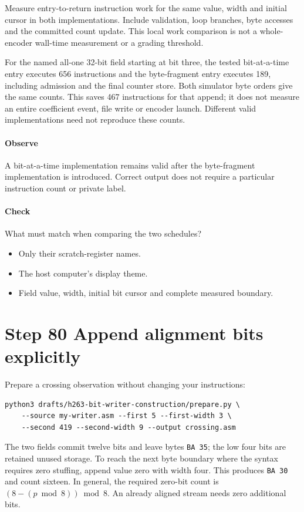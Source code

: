 Measure entry-to-return instruction work for the same value, width and initial
cursor in both implementations. Include validation, loop branches, byte accesses
and the committed count update. This local work comparison is not a whole-encoder
wall-time measurement or a grading threshold.

For the named all-one 32-bit field starting at bit three, the tested bit-at-a-time
entry executes 656 instructions and the byte-fragment entry executes 189, including
admission and the final counter store. Both simulator byte orders give the same
counts. This saves 467 instructions for that append; it does not measure an entire
coefficient event, file write or encoder launch. Different valid implementations
need not reproduce these counts.

\paragraph{Observe} A bit-at-a-time implementation remains valid after the
byte-fragment implementation is introduced. Correct output does not require a
particular instruction count or private label.
\paragraph{Check} What must match when comparing the two schedules?
\begin{itemize}
  \item[A.] Only their scratch-register names.
  \item[B.] The host computer's display theme.
  \item[C.] Field value, width, initial bit cursor and complete measured boundary.
\end{itemize}

\section{Step 80 Append alignment bits explicitly}\label{h263-writer-s10}
Prepare a crossing observation without changing your instructions:
\begin{verbatim}
python3 drafts/h263-bit-writer-construction/prepare.py \
    --source my-writer.asm --first 5 --first-width 3 \
    --second 419 --second-width 9 --output crossing.asm
\end{verbatim}
The two fields commit twelve bits and leave bytes \texttt{BA 35}; the low four
bits are retained unused storage. To reach the next byte boundary where the
syntax requires zero stuffing, append value zero with width four. This produces
\texttt{BA 30} and count sixteen. In general, the required zero-bit count is
$(8-(p\bmod8))\bmod8$. An already aligned stream needs zero additional bits.

